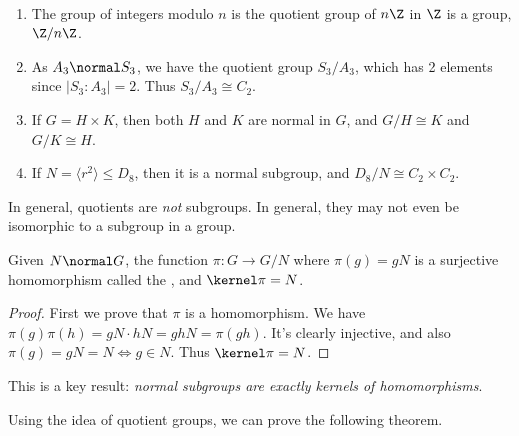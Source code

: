 \begin{example}~
	    \vspace*{-1.5\baselineskip}
	\begin{enumerate}[label=(\roman*)]
		\item The group of integers modulo $n$ is the quotient group of $n\Z$ in $\Z$ is a group, $\Z/n\Z$.
		\item As $A_3 \normal S_3$, we have the quotient group $S_3/A_3$, which has 2 elements since $|S_3 : A_3| = 2$. Thus $S_3 / A_3 \cong C_2$.
		\item If $G = H \times K$, then both $H$ and $K$ are normal in $G$, and $G/H \cong K$ and $G/K \cong H$.
		\item If $N = \langle r^2 \rangle \leq D_8$, then it is a normal subgroup, and $D_8/N \cong C_2 \times C_2$. 
	\end{enumerate}
\end{example}

\begin{remark}
	In general, quotients are \emph{not} subgroups. In general, they may not even be isomorphic to a subgroup in a group.
\end{remark}

\begin{theorem}
	Given $N \normal G$, the function $\pi : G \rightarrow G/N$ where $\pi(g) = gN$ is a surjective homomorphism called the , and $\kernel \pi = N$.
\end{theorem}
\begin{proof}
	First we prove that $\pi$ is a homomorphism. We have $\pi(g)\pi(h) = gN \cdot hN = gh N = \pi(gh)$. It's clearly injective, and also $\pi(g)= gN = N \iff g \in N$. Thus $\kernel \pi = N$.
\end{proof}

This is a key result: \emph{normal subgroups are exactly kernels of homomorphisms}.


Using the idea of quotient groups, we can prove the following theorem.

